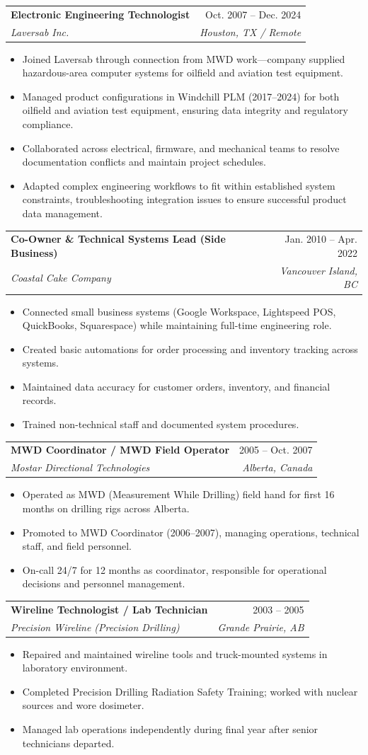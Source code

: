 \documentclass[letterpaper,11pt]{article}
\makeatletter
\newcommand{\resumeItem}[1]{
  \item\small{
    {#1 \vspace{-2pt}}
  }
}
\newcommand{\resumeSubheading}[4]{
  \vspace{-2pt}\item
    \begin{tabular*}{0.97\textwidth}[t]{l@{\extracolsep{\fill}}r}
      \textbf{#1} & #2 \\
      \textit{\small#3} & \textit{\small #4} \\
    \end{tabular*}\vspace{-7pt}
}
\newcommand{\resumeItemListStart}{\begin{itemize}}
\newcommand{\resumeItemListEnd}{\end{itemize}\vspace{-5pt}}
\makeatother
\begin{document}
    \resumeSubheading
      {Electronic Engineering Technologist}{Oct. 2007 -- Dec. 2024}
      {Laversab Inc.}{Houston, TX / Remote}
      \resumeItemListStart
        \resumeItem{Joined Laversab through connection from MWD work---company supplied hazardous-area computer systems for oilfield and aviation test equipment.}
        \resumeItem{Managed product configurations in Windchill PLM (2017--2024) for both oilfield and aviation test equipment, ensuring data integrity and regulatory compliance.}
        \resumeItem{Collaborated across electrical, firmware, and mechanical teams to resolve documentation conflicts and maintain project schedules.}
        \resumeItem{Adapted complex engineering workflows to fit within established system constraints, troubleshooting integration issues to ensure successful product data management.}
      \resumeItemListEnd

    \resumeSubheading
      {Co-Owner \& Technical Systems Lead (Side Business)}{Jan. 2010 -- Apr. 2022}
      {Coastal Cake Company}{Vancouver Island, BC}
      \resumeItemListStart
        \resumeItem{Connected small business systems (Google Workspace, Lightspeed POS, QuickBooks, Squarespace) while maintaining full-time engineering role.}
        \resumeItem{Created basic automations for order processing and inventory tracking across systems.}
        \resumeItem{Maintained data accuracy for customer orders, inventory, and financial records.}
        \resumeItem{Trained non-technical staff and documented system procedures.}
      \resumeItemListEnd

    \resumeSubheading
      {MWD Coordinator / MWD Field Operator}{2005 -- Oct. 2007}
      {Mostar Directional Technologies}{Alberta, Canada}
      \resumeItemListStart
        \resumeItem{Operated as MWD (Measurement While Drilling) field hand for first 16 months on drilling rigs across Alberta.}
        \resumeItem{Promoted to MWD Coordinator (2006--2007), managing operations, technical staff, and field personnel.}
        \resumeItem{On-call 24/7 for 12 months as coordinator, responsible for operational decisions and personnel management.}
      \resumeItemListEnd

    \resumeSubheading
      {Wireline Technologist / Lab Technician}{2003 -- 2005}
      {Precision Wireline (Precision Drilling)}{Grande Prairie, AB}
      \resumeItemListStart
        \resumeItem{Repaired and maintained wireline tools and truck-mounted systems in laboratory environment.}
        \resumeItem{Completed Precision Drilling Radiation Safety Training; worked with nuclear sources and wore dosimeter.}
        \resumeItem{Managed lab operations independently during final year after senior technicians departed.}
      \resumeItemListEnd
\end{document}
